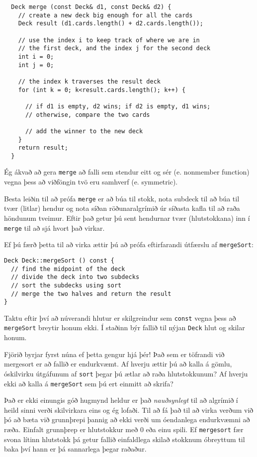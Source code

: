 \begin{verbatim}
  Deck merge (const Deck& d1, const Deck& d2) {
    // create a new deck big enough for all the cards
    Deck result (d1.cards.length() + d2.cards.length());

    // use the index i to keep track of where we are in
    // the first deck, and the index j for the second deck
    int i = 0;
    int j = 0;
		
    // the index k traverses the result deck
    for (int k = 0; k<result.cards.length(); k++) {
			
      // if d1 is empty, d2 wins; if d2 is empty, d1 wins;
      // otherwise, compare the two cards
			
      // add the winner to the new deck
    }
    return result;
  }
\end{verbatim}
%
Ég ákvað að gera {\tt merge} að falli sem stendur eitt og sér (e. nonmember function) vegna þess að viðföngin tvö eru samhverf (e. symmetric). 

Besta leiðin til að prófa {\tt merge} er að búa til stokk, nota subdeck til að búa til tvær (litlar) hendur
og nota síðan röðunaralgrímið úr síðasta kafla til að raða höndunum tveimur.
Eftir það getur þú sent hendurnar tvær (hlutstokkana) inn í {\tt merge} til að sjá hvort það virkar. 


Ef þú færð þetta til að virka ættir þú að prófa eftirfarandi útfærslu af {\tt mergeSort}:

\begin{verbatim}
Deck Deck::mergeSort () const {
  // find the midpoint of the deck
  // divide the deck into two subdecks
  // sort the subdecks using sort
  // merge the two halves and return the result
}
\end{verbatim}
%
Taktu eftir því að núverandi hlutur er skilgreindur sem {\tt const} vegna þess að 
{\tt mergeSort} breytir honum ekki. Í staðinn býr fallið til nýjan {\tt Deck} hlut og skilar honum. 

Fjörið byrjar fyrst núna ef þetta gengur hjá þér! 
Það sem er töfrandi við mergesort er að fallið er endurkvæmt.
Af hverju ættir þú að kalla á gömlu, óskilvirku útgáfunum af {\tt sort} þegar þú ætlar að raða hlutstokkunum?
Af hverju ekki að kalla á {\tt mergeSort} sem þú ert einmitt að skrifa? 


Það er ekki einungis góð hugmynd heldur er það {\em nauðsynlegt} til að algrímið í heild sinni verði skilvirkara eins og ég lofaði.
Til að fá það til að virka verðum við þó að bæta við grunnþrepi þannig að ekki verði um óendanlega endurkvæmni að ræða.
Einfalt grunnþrep er hlutstokkur með 0 eða einu spili.
Ef {\tt mergesort} fær svona lítinn hlutstokk þá getur fallið einfaldlega skilað stokknum óbreyttum til baka því hann er þá sannarlega þegar raðaður.

